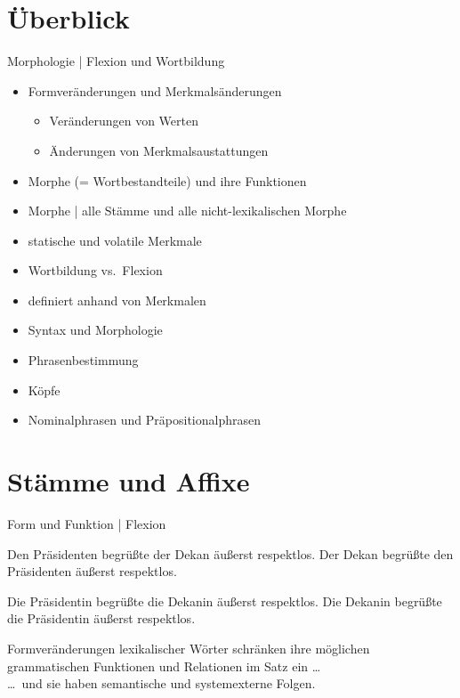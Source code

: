 \section{Überblick}

\begin{frame}
  {Morphologie | Flexion und Wortbildung}
  \pause
  \begin{itemize}[<+->]
    \item \alert{Formveränderungen} und \alert{Merkmalsänderungen}
      \begin{itemize}[<+->]
        \item Veränderungen von Werten
        \item Änderungen von Merkmalsaustattungen
      \end{itemize}
      \Halbzeile
    \item Morphe (= Wortbestandteile) und ihre Funktionen
    \item Morphe | alle Stämme und alle nicht-lexikalischen Morphe
      \Halbzeile
    \item statische und volatile Merkmale
    \item Wortbildung vs.\ Flexion
    \item definiert anhand von Merkmalen
      \Halbzeile
    \item Syntax und Morphologie
    \item Phrasenbestimmung
    \item Köpfe
    \item Nominalphrasen und Präpositionalphrasen
  \end{itemize}
\end{frame}


\section{Stämme und Affixe}

\begin{frame}
  {Form und Funktion | Flexion}
  \pause
  \begin{exe}
    \ex
    \begin{xlist}
      \ex \alert{Den Präsidenten} begrüßte \alert{der Dekan} äußerst respektlos.
      \pause
      \ex \alert{Der Dekan} begrüßte \alert{den Präsidenten} äußerst respektlos.
    \end{xlist}
    \pause
    \ex
    \begin{xlist}
      \ex \alert{Die Präsidentin} begrüßte \alert{die Dekanin} äußerst respektlos.
      \pause
      \ex \alert{Die Dekanin} begrüßte \alert{die Präsidentin} äußerst respektlos.
    \end{xlist}
  \end{exe}
  \pause
  \Zeile
  Formveränderungen lexikalischer Wörter \alert{schränken ihre möglichen grammatischen Funktionen und Relationen im Satz ein} \dots\\
  \pause
  \Halbzeile
  \dots\ und sie haben semantische und systemexterne Folgen.

\end{frame}

